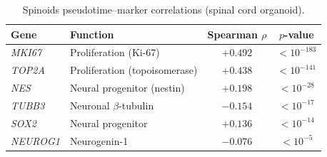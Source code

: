 \documentclass[journal]{IEEEtran}
\begin{document}
\begin{table}[!t]
    \centering
    \caption{Spinoids pseudotime--marker correlations (spinal cord organoid).}
    \label{tab:spinoids_markers}
    \begin{tabular}{llcc}
        \toprule
        Gene & Function & Spearman $\rho$ & $p$-value \\
        \midrule
        \textit{MKI67}   & Proliferation (Ki-67)         & $+0.492$ & $< 10^{-183}$ \\
        \textit{TOP2A}   & Proliferation (topoisomerase)  & $+0.438$ & $< 10^{-141}$ \\
        \textit{NES}     & Neural progenitor (nestin)     & $+0.198$ & $< 10^{-28}$  \\
        \textit{TUBB3}   & Neuronal $\beta$-tubulin       & $-0.154$ & $< 10^{-17}$  \\
        \textit{SOX2}    & Neural progenitor              & $+0.136$ & $< 10^{-14}$  \\
        \textit{NEUROG1} & Neurogenin-1                   & $-0.076$ & $< 10^{-5}$   \\
        \bottomrule
    \end{tabular}
\end{table}

\balance


\end{document}
